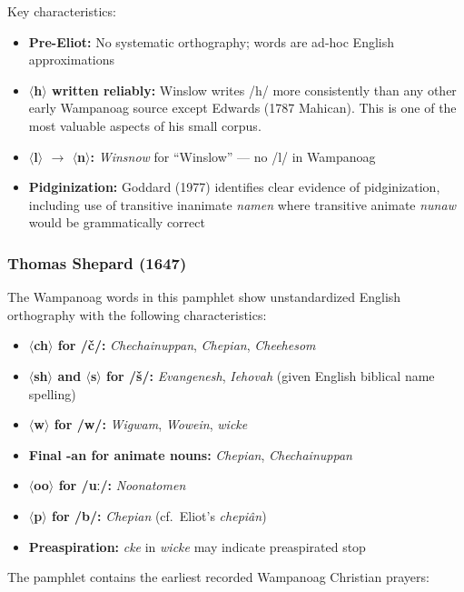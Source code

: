 Key characteristics:
\begin{itemize}
  \item \textbf{Pre-Eliot:} No systematic orthography; words are ad-hoc English
    approximations
  \item \textbf{$\langle$h$\rangle$ written reliably:} Winslow writes /h/ more
    consistently than any other early Wampanoag source except Edwards (1787
    Mahican). This is one of the most valuable aspects of his small corpus.
  \item \textbf{$\langle$l$\rangle$ $\rightarrow$ $\langle$n$\rangle$:}
    \emph{Winsnow} for ``Winslow'' --- no /l/ in Wampanoag
  \item \textbf{Pidginization:} Goddard (1977) identifies clear evidence of
    pidginization, including use of transitive inanimate \emph{namen} where
    transitive animate \emph{nunaw} would be grammatically correct
\end{itemize}

\subsubsection{Thomas Shepard (1647)}

The Wampanoag words in this pamphlet show unstandardized English orthography
with the following characteristics:

\begin{itemize}
  \item \textbf{$\langle$ch$\rangle$ for /č/:} \emph{Chechainuppan},
    \emph{Chepian}, \emph{Cheehesom}
  \item \textbf{$\langle$sh$\rangle$ and $\langle$s$\rangle$ for /š/:}
    \emph{Evangenesh}, \emph{Iehovah} (given English biblical name spelling)
  \item \textbf{$\langle$w$\rangle$ for /w/:} \emph{Wigwam}, \emph{Wowein},
    \emph{wicke}
  \item \textbf{Final -an for animate nouns:} \emph{Chepian},
    \emph{Chechainuppan}
  \item \textbf{$\langle$oo$\rangle$ for /uː/:} \emph{Noonatomen}
  \item \textbf{$\langle$p$\rangle$ for /b/:} \emph{Chepian} (cf.\ Eliot's
    \emph{chepiân})
  \item \textbf{Preaspiration:} \emph{cke} in \emph{wicke} may indicate
    preaspirated stop
\end{itemize}

The pamphlet contains the earliest recorded Wampanoag Christian prayers:

